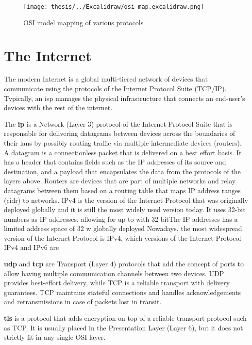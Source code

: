 \newpage

\begin{figure}
\centering
\texttt{[image: thesis/../Excalidraw/osi-map.excalidraw.png]}
\caption{OSI model mapping of various protocols \label{osiMap}}
\end{figure}

\hypertarget{the-internet}{%
\section{The Internet}\label{the-internet}}

The modern Internet is a global multi-tiered network of devices that
communicate using the protocols of the Internet Protocol Suite (TCP/IP).
Typically, an \gls{isp} manages the physical infrastructure that
connects an end-user's devices with the rest of the internet.

The \textbf{\acrfull{ip}} is a Network (Layer 3) protocol of the
Internet Protocol Suite that is responsible for delivering datagrams
between devices across the boundaries of their \glspl{lan} by possibly
routing traffic via multiple intermediate devices (routers). A datagram
is a connectionless packet that is delivered on a best effort basis. It
has a header that contains fields such as the IP addresses of its source
and destination, and a payload that encapsulates the data from the
protocols of the layers above. Routers are devices that are part of
multiple networks and relay datagrams between them based on a routing
table that maps IP address ranges (\gls{cidr}) to networks. IPv4 is the
version of the Internet Protocol that was originally deployed globally
and it is still the most widely used version today. It uses 32-bit
numbers as IP addresses, allowing for up to with 32 bitThe IP addresses
has a limited address space of 32 w globally deployed Nowadays, the most
widespread version of the Internet Protocol is IPv4, which versions of
the Internet Protocol IPv4 and IPv6 are

\textbf{\acrfull{udp}} and \textbf{\acrfull{tcp}} are Transport (Layer
4) protocols that add the concept of ports to allow having multiple
communication channels between two devices. UDP provides best-effort
delivery, while TCP is a reliable transport with delivery guarantees.
TCP maintains stateful connections and handles acknowledgements and
retransmissions in case of packets lost in transit.

\textbf{\acrfull{tls}} is a protocol that adds encryption on top of a
reliable transport protocol such as TCP. It is usually placed in the
Presentation Layer (Layer 6), but it does not strictly fit in any single
OSI layer. 

